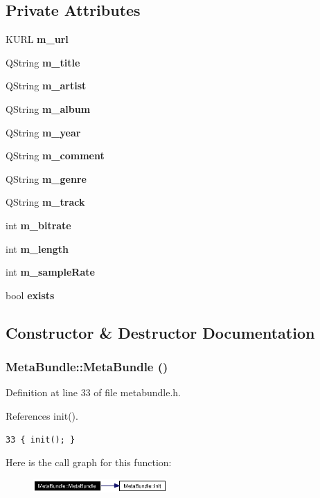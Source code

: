\subsection*{Private Attributes}
\begin{CompactItemize}
\item 
KURL {\bf m\_\-url}
\item 
QString {\bf m\_\-title}
\item 
QString {\bf m\_\-artist}
\item 
QString {\bf m\_\-album}
\item 
QString {\bf m\_\-year}
\item 
QString {\bf m\_\-comment}
\item 
QString {\bf m\_\-genre}
\item 
QString {\bf m\_\-track}
\item 
int {\bf m\_\-bitrate}
\item 
int {\bf m\_\-length}
\item 
int {\bf m\_\-sample\-Rate}
\item 
bool {\bf exists}
\end{CompactItemize}


\subsection{Constructor \& Destructor Documentation}
\subsubsection{\setlength{\rightskip}{0pt plus 5cm}Meta\-Bundle::Meta\-Bundle ()\hspace{0.3cm}{\tt  [inline]}}\label{classMetaBundle_MetaBundlea0}




Definition at line 33 of file metabundle.h.

References init().



\footnotesize\begin{verbatim}33 { init(); }
\end{verbatim}\normalsize 


Here is the call graph for this function:\begin{figure}[H]
\begin{center}
\leavevmode
\includegraphics[width=145pt]{classMetaBundle_MetaBundlea0_cgraph}
\end{center}
\end{figure}
